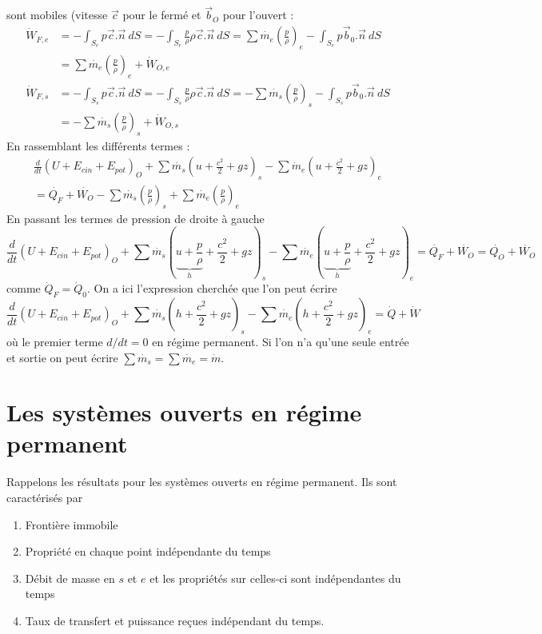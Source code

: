 sont mobiles (vitesse $\vec{c}$ pour le fermé et $\vec{b}_O$ pour l'ouvert :
\begin{equation}
\begin{split}
\dot{W}_{F,e} &= -\int_{S_e}p\vec{c}.\vec{n}\ dS = -\int_{S_e} \frac{p}{\rho}\rho
\vec{c}.\vec{n}\ dS = \sum\dot{m_e}\left(\frac{p}{\rho}\right)_e-\int_{S_e}
p\vec{b}_0.\vec{n}\ dS\\
 &=  \sum\dot{m_e}\left(\frac{p}{\rho}\right)_e + \dot{W}_{O,e}\\
\dot{W}_{F,s} &= -\int_{S_s}p\vec{c}.\vec{n}\ dS = -\int_{S_s} \frac{p}{\rho}\rho
\vec{c}.\vec{n}\ dS = -\sum\dot{m_s}\left(\frac{p}{\rho}\right)_s-\int_{S_s}
p\vec{b}_0.\vec{n}\ dS\\
 &= - \sum\dot{m_s}\left(\frac{p}{\rho}\right)_s + \dot{W}_{O,s}
\end{split}
\end{equation}
En rassemblant les différents termes :
\begin{equation}
\begin{split}
\frac{d}{dt}\left(U+E_{cin}+E_{pot}\right)_O + \sum \dot{m_s}\left(u+\frac{c^2}{2}+gz\right)_s-\sum \dot{m}_e\left(u+\frac{c^2}{2}+gz\right)_e \\
= \dot{Q_F}+\dot{W_O}
-\sum\dot{m_s}\left(\frac{p}{\rho}\right)_s+\sum\dot{m_e}\left(\frac{p}{\rho}\right)_e
\end{split}
\end{equation}
En passant les termes de pression de droite à gauche
\begin{equation}
\frac{d}{dt}\left(U+E_{cin}+E_{pot}\right)_O + \sum \dot{m_s}\left(\underbrace{u + 
\frac{p}{\rho}}_{h} + \frac{c^2}{2}+gz\right)_s-\sum \dot{m_e}\left(\underbrace{u + 
\frac{p}{\rho}}_{h} + \frac{c^2}{2}+gz\right)_e = \dot{Q_F}+\dot{W_O} = \dot{Q_O}+
\dot{W_O}
\end{equation}
comme $\dot{Q}_F = \dot{Q}_0$. On a ici l'expression cherchée que l'on peut écrire 
\begin{equation}
\frac{d}{dt}\left(U+E_{cin}+E_{pot}\right)_O + \sum \dot{m_s}\left(h+\frac{c^2}{2}
+gz\right)_s-\sum \dot{m_e}\left(h+\frac{c^2}{2}+gz\right)_e = \dot{Q}+\dot{W}
\end{equation}
où le premier terme $d/dt=0$ en régime permanent. Si l'on n'a qu'une seule entrée 
et sortie on peut écrire $\sum \dot{m_s}=\sum \dot{m_e}=\dot{m}$.


\section{Les systèmes ouverts en régime permanent}
Rappelons les résultats pour les systèmes ouverts en régime permanent. Ils sont 
caractérisés par 
\begin{enumerate}
\item Frontière immobile
\item Propriété en chaque point indépendante du temps
\item Débit de masse en $s$ et $e$ et les propriétés sur celles-ci sont 
indépendantes du temps
\item Taux de transfert et puissance reçues indépendant du temps.
\end{enumerate}


